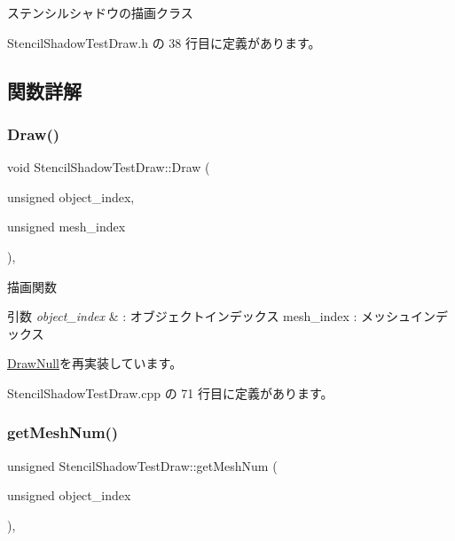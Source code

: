 ステンシルシャドウの描画クラス 

 Stencil\+Shadow\+Test\+Draw.\+h の 38 行目に定義があります。



\subsection{関数詳解}
\mbox{\label{class_stencil_shadow_test_draw_abb5f9445b7d94c213a3751fa57e36643}} 
\subsubsection{\texorpdfstring{Draw()}{Draw()}}
{\footnotesize\ttfamily void Stencil\+Shadow\+Test\+Draw\+::\+Draw (\begin{DoxyParamCaption}\item[{unsigned}]{object\+\_\+index,  }\item[{unsigned}]{mesh\+\_\+index }\end{DoxyParamCaption})\hspace{0.3cm}{\ttfamily [override]}, {\ttfamily [virtual]}}



描画関数 


\begin{DoxyParams}{引数}
{\em object\+\_\+index} & \+: オブジェクトインデックス mesh\+\_\+index \+: メッシュインデックス \\
\hline
\end{DoxyParams}


\mbox{\hyperlink{class_draw_null_a72ac0b7dc40b1469582419dcc5b0e114}{Draw\+Null}}を再実装しています。



 Stencil\+Shadow\+Test\+Draw.\+cpp の 71 行目に定義があります。

\mbox{\label{class_stencil_shadow_test_draw_a285b3045ff5cc34b6b2b991cca434bb3}} 
\subsubsection{\texorpdfstring{get\+Mesh\+Num()}{getMeshNum()}}
{\footnotesize\ttfamily unsigned Stencil\+Shadow\+Test\+Draw\+::get\+Mesh\+Num (\begin{DoxyParamCaption}\item[{unsigned}]{object\+\_\+index }\end{DoxyParamCaption})\hspace{0.3cm}{\ttfamily [override]}, {\ttfamily [virtual]}}



